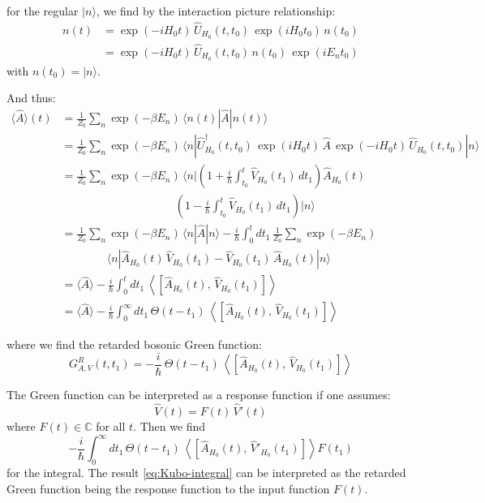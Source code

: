 for the regular $|n\rangle$, we find by the interaction picture relationship:
\begin{align*}
    n(t) &= \exp(-i H_0 t)\, \hat{U}_{H_0}(t,t_0)\, \exp(i H_0 t_0)\, n(t_0) \\
         &= \exp(-i H_0 t)\, \hat{U}_{H_0}(t,t_0)\, n(t_0)\, \exp(i E_n t_0)
\end{align*}
with $n(t_0) = |n\rangle$.

And thus:
\begin{align*}
    \langle \hat{A} \rangle(t) &= \frac{1}{Z_0} \sum_n \exp(-\beta E_n)\, \langle n(t) | \hat{A} | n(t) \rangle \\[1ex]
    &= \frac{1}{Z_0} \sum_n \exp(-\beta E_n)\, \langle n | \hat{U}_{H_0}^{\dagger}(t,t_0)\, \exp(i H_0 t)\, \hat{A}\, \exp(-i H_0 t)\, \hat{U}_{H_0}(t,t_0) | n \rangle \\[1ex]
    &= \frac{1}{Z_0} \sum_n \exp(-\beta E_n)\, \langle n | \left(1 + \frac{i}{\hbar} \int_{t_0}^{t} \hat{V}_{H_0}(t_1)\, dt_1\right) \hat{A}_{H_0}(t) \\
    &\qquad\qquad\qquad\qquad\qquad \left(1 - \frac{i}{\hbar} \int_{t_0}^{t} \hat{V}_{H_0}(t_1)\, dt_1\right) | n \rangle \\[1ex]
    &= \frac{1}{Z_0} \sum_n \exp(-\beta E_n)\, \langle n | \hat{A} | n \rangle
       - \frac{i}{\hbar} \int_{0}^{t} dt_1\, \frac{1}{Z_0} \sum_n \exp(-\beta E_n) \\
    &\qquad\qquad \langle n | \hat{A}_{H_0}(t)\, \hat{V}_{H_0}(t_1) - \hat{V}_{H_0}(t_1)\, \hat{A}_{H_0}(t) | n \rangle \\[1ex]
    &= \langle \hat{A} \rangle - \frac{i}{\hbar} \int_{0}^{t} dt_1\, \left\langle \left[ \hat{A}_{H_0}(t),\, \hat{V}_{H_0}(t_1) \right] \right\rangle \\[1ex]
    &= \langle \hat{A} \rangle - \frac{i}{\hbar} \int_{0}^{\infty} dt_1\, \Theta(t-t_1)\, \left\langle \left[ \hat{A}_{H_0}(t),\, \hat{V}_{H_0}(t_1) \right] \right\rangle
\end{align*}

where we find the retarded bosonic Green function:
\begin{equation}
    \boxed{\,G^{R}_{A,V}(t,t_1) = -\frac{i}{\hbar}\, \Theta(t-t_1)\, \left\langle \left[ \hat{A}_{H_0}(t),\, \hat{V}_{H_0}(t_1) \right] \right\rangle\,} \label{eq:kuboformula}
\end{equation}

The Green function can be interpreted as a response function if one assumes:
\begin{equation*}
    \hat{V}(t) = F(t)\, \hat{V}'(t)
\end{equation*}
where $F(t) \in \mathbb{C}$ for all $t$. Then we find
\begin{equation}
    -\frac{i}{\hbar} \int_{0}^{\infty} dt_1\, \Theta(t-t_1)\, \left\langle \left[ \hat{A}_{H_0}(t),\, \hat{V}'_{H_0}(t_1) \right] \right\rangle F(t_1) \label{eq:Kubo-integral}
\end{equation}
for the integral. The result \eqref{eq:Kubo-integral} can be interpreted as the retarded Green function being the response function to the input function $F(t)$.

